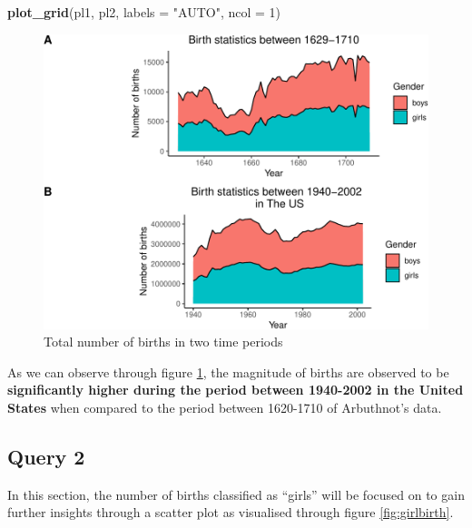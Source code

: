 \documentclass[11pt,a4paper,]{article}
\newenvironment{Shaded}{\begin{snugshade}}{\end{snugshade}}
\newcommand{\AttributeTok}[1]{\textcolor[rgb]{0.13,0.29,0.53}{#1}}
\newcommand{\DecValTok}[1]{\textcolor[rgb]{0.00,0.00,0.81}{#1}}
\newcommand{\FunctionTok}[1]{\textcolor[rgb]{0.13,0.29,0.53}{\textbf{#1}}}
\newcommand{\NormalTok}[1]{#1}
\newcommand{\StringTok}[1]{\textcolor[rgb]{0.31,0.60,0.02}{#1}}
\begin{document}
\begin{Shaded}
\begin{Highlighting}[]
\FunctionTok{plot\_grid}\NormalTok{(pl1, pl2, }\AttributeTok{labels =} \StringTok{"AUTO"}\NormalTok{, }\AttributeTok{ncol =} \DecValTok{1}\NormalTok{)}
\end{Highlighting}
\end{Shaded}

\begin{figure}

{\centering \includegraphics{Arindom_Baruah_32779267_files/figure-latex/figbirth-1} 

}

\caption{Total number of births in two time periods}\label{fig:figbirth}
\end{figure}

\normalsize

As we can observe through figure \ref{fig:figbirth}, the magnitude of births are observed to be \textbf{significantly higher during the period between 1940-2002 in the United States} when compared to the period between 1620-1710 of Arbuthnot's data.

\hypertarget{query-2}{%
\subsection{Query 2}\label{query-2}}

In this section, the number of births classified as ``girls'' will be focused on to gain further insights through a scatter plot as visualised through figure \ref{fig:girlbirth}.

\tiny
\end{document}
